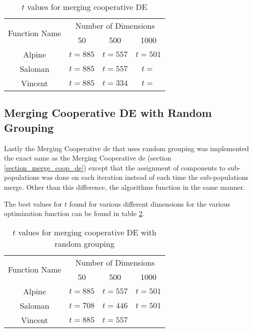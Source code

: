 \documentclass[hidelinks,english,conference]{IEEEtran}
\begin{document}
		\begin{table}
			\centering
			\begin{tabular}{ | c | c | c | c | }
				\hline
				\multirow{2}{*}{Function Name} & \multicolumn{3}{|c|}{Number of Dimensions} \\\cline{2-4}
				 & 50 & 500 & 1000\\
				\hline
				Alpine & $t=885$ & $t=557$ & $t=501$ \\
				\hline
				Saloman & $t=885$ & $t=557$ & $t=$ \\
				\hline
				Vincent & $t=885$ & $t=334$ & $t=$ \\
				\hline
			\end{tabular}
			\caption{$t$ values for merging cooperative DE}
			\label{table_merge_t_value}
		\end{table}

	\subsection{Merging Cooperative DE with Random Grouping} %
		Lastly the Merging Cooperative \gls{de} that uses random grouping was implemented the exact same as the Merging Cooperative \gls{de} (section \ref{section_merge_coop_de}) except that the assignment of components to sub-populations was done on each iteration instead of each time the sub-populations merge. Other than this difference, the algorithms function in the same manner.

		The best values for $t$ found for various different dimensions for the various optimization function can be found in table \ref{table_merge_random_t_value}. 

		\begin{table}
			\centering
			\begin{tabular}{ | c | c | c | c | }
				\hline
				\multirow{2}{*}{Function Name} & \multicolumn{3}{|c|}{Number of Dimensions} \\\cline{2-4}
				 & 50 & 500 & 1000\\
				\hline
				Alpine & $t=885$ & $t=557$ & $t=501$ \\
				\hline
				Saloman & $t=708$ & $t=446$ & $t=501$ \\
				\hline
				Vincent & $t=885$ & $t=557$ & \\
				\hline
			\end{tabular}
			\caption{$t$ values for merging cooperative DE with random grouping}
			\label{table_merge_random_t_value}
		\end{table}
        
\end{document}
